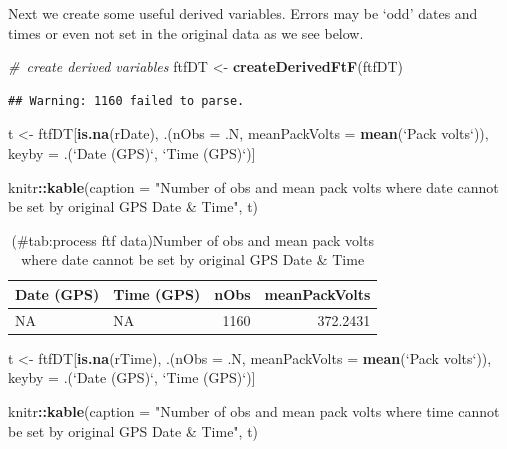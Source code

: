 \documentclass[]{article}
\newenvironment{Shaded}{\begin{snugshade}}{\end{snugshade}}
\newcommand{\KeywordTok}[1]{\textcolor[rgb]{0.13,0.29,0.53}{\textbf{#1}}}
\newcommand{\DataTypeTok}[1]{\textcolor[rgb]{0.13,0.29,0.53}{#1}}
\newcommand{\StringTok}[1]{\textcolor[rgb]{0.31,0.60,0.02}{#1}}
\newcommand{\CommentTok}[1]{\textcolor[rgb]{0.56,0.35,0.01}{\textit{#1}}}
\newcommand{\OperatorTok}[1]{\textcolor[rgb]{0.81,0.36,0.00}{\textbf{#1}}}
\newcommand{\NormalTok}[1]{#1}
\begin{document}
Next we create some useful derived variables. Errors may be `odd' dates
and times or even not set in the original data as we see below.

\begin{Shaded}
\begin{Highlighting}[]
\CommentTok{# create derived variables}
\NormalTok{ftfDT <-}\StringTok{ }\KeywordTok{createDerivedFtF}\NormalTok{(ftfDT)}
\end{Highlighting}
\end{Shaded}

\begin{verbatim}
## Warning: 1160 failed to parse.
\end{verbatim}

\begin{Shaded}
\begin{Highlighting}[]
\NormalTok{t <-}\StringTok{ }\NormalTok{ftfDT[}\KeywordTok{is.na}\NormalTok{(rDate), .(}\DataTypeTok{nObs =}\NormalTok{ .N,}
                           \DataTypeTok{meanPackVolts =} \KeywordTok{mean}\NormalTok{(}\StringTok{`}\DataTypeTok{Pack volts}\StringTok{`}\NormalTok{)), }
\NormalTok{           keyby =}\StringTok{ }\NormalTok{.(}\StringTok{`}\DataTypeTok{Date (GPS)}\StringTok{`}\NormalTok{, }\StringTok{`}\DataTypeTok{Time (GPS)}\StringTok{`}\NormalTok{)]}

\NormalTok{knitr}\OperatorTok{::}\KeywordTok{kable}\NormalTok{(}\DataTypeTok{caption =} \StringTok{"Number of obs and mean pack volts where date cannot be set by original GPS Date & Time"}\NormalTok{, t)}
\end{Highlighting}
\end{Shaded}

\begin{table}[t]

\caption{(\#tab:process ftf data)Number of obs and mean pack volts where date cannot be set by original GPS Date & Time}
\centering
\begin{tabular}{l|l|r|r}
\hline
Date (GPS) & Time (GPS) & nObs & meanPackVolts\\
\hline
NA & NA & 1160 & 372.2431\\
\hline
\end{tabular}
\end{table}

\begin{Shaded}
\begin{Highlighting}[]
\NormalTok{t <-}\StringTok{ }\NormalTok{ftfDT[}\KeywordTok{is.na}\NormalTok{(rTime), .(}\DataTypeTok{nObs =}\NormalTok{ .N,}
                           \DataTypeTok{meanPackVolts =} \KeywordTok{mean}\NormalTok{(}\StringTok{`}\DataTypeTok{Pack volts}\StringTok{`}\NormalTok{)), }
\NormalTok{           keyby =}\StringTok{ }\NormalTok{.(}\StringTok{`}\DataTypeTok{Date (GPS)}\StringTok{`}\NormalTok{, }\StringTok{`}\DataTypeTok{Time (GPS)}\StringTok{`}\NormalTok{)]}

\NormalTok{knitr}\OperatorTok{::}\KeywordTok{kable}\NormalTok{(}\DataTypeTok{caption =} \StringTok{"Number of obs and mean pack volts where time cannot be set by original GPS Date & Time"}\NormalTok{, t)}
\end{Highlighting}
\end{Shaded}
\end{document}
